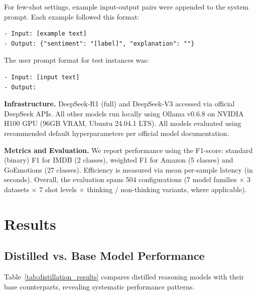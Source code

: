 \documentclass[runningheads]{llncs}
\begin{document}
For few-shot settings, example input-output pairs were appended to the system prompt. Each example followed this format:

\begin{verbatim}   
- Input: [example text]
- Output: {"sentiment": "[label]", "explanation": ""}
\end{verbatim}

The user prompt format for test instances was:

\begin{verbatim}   
- Input: [input text]
- Output:
\end{verbatim}


\textbf{Infrastructure.} DeepSeek-R1 (full) and DeepSeek-V3 accessed via official DeepSeek APIs. All other models run locally using Ollama v0.6.8 on NVIDIA H100 GPU (96GB VRAM, Ubuntu 24.04.1 LTS). All models evaluated using recommended default hyperparameters per official model documentation.

\textbf{Metrics and Evaluation.} 
We report performance using the F1-score: standard (binary) F1 for IMDB (2 classes), weighted F1 for Amazon (5 classes) and GoEmotions (27 classes). 
Efficiency is measured via mean per-sample latency (in seconds). 
Overall, the evaluation spans 504 configurations (7 model families × 3 datasets × 7 shot levels × thinking / non-thinking variants, where applicable).

\section{Results}

\subsection{Distilled vs. Base Model Performance}

Table~\ref{tab:distillation_results} compares distilled reasoning models with their base counterparts, revealing systematic performance patterns.
\end{document}
